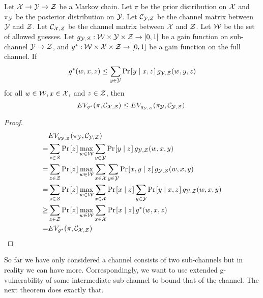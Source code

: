 \begin{theorem} \label{thm DPI 3}
	Let $\mathcal{X} \rightarrow \mathcal{Y} \rightarrow \mathcal{Z}$ be a Markov chain. Let $\pi$ be the prior distribution on $\mathcal{X}$ and $\pi_{\mathcal{Y}}$ be the posterior distribution on $\mathcal{Y}$. Let $\mathcal{C}_{\mathcal{Y}, \mathcal{Z}}$ be the channel matrix between $\mathcal{Y}$ and $\mathcal{Z}$. Let $\mathcal{C}_{\mathcal{X},\mathcal{Z}}$ be the channel matrix between $\mathcal{X}$ and $\mathcal{Z}$. Let $\mathcal{W}$ be the set of allowed guesses. Let $g_{\mathcal{Y},\mathcal{Z}}: \mathcal{W} \times \mathcal{Y} \times \mathcal{Z} \rightarrow [0,1]$ be a gain function on sub-channel $\mathcal{Y} \rightarrow \mathcal{Z}$, and $g^{*}: \mathcal{W} \times \mathcal{X} \times \mathcal{Z} \rightarrow [0,1]$ be a gain function on the full channel. If
	\begin{equation} \label{thm DPI 3 condition}
	g^{*}(w, x, z) \leq \sum_{y \in \Y} \prob{y \mid x, z} g_{\Y, \Z}(w, y, z)
	\end{equation}
	for all $w \in \mathcal{W}, x \in \mathcal{X},$ and $z \in \mathcal{Z}$, then
	\begin{equation*}
	EV_{g^{*}}(\pi, \mathcal{C}_{\mathcal{X},\mathcal{Z}}) \leq EV_{g_{\mathcal{Y},\mathcal{Z}}}(\pi_{\mathcal{Y}}, \mathcal{C}_{\mathcal{Y},\mathcal{Z}}).
	\end{equation*}
\end{theorem}


\begin{proof}
	\begin{align*}
	  &	EV_{g_{\Y,\Z}}(\pi_{\Y}, \channel_{\Y,\Z}) \\
	= & \sum_{z \in \Z} \prob{z} \max_{w \in \W} \sum_{y \in \Y} \prob{y \mid z} g_{\Y, \Z}(w, x, y) \\
	= & \sum_{z \in \Z} \prob{z} \max_{w \in \W} \sum_{x \in \X} \sum_{y \in \Y} \prob{x, y \mid z} g_{\Y, \Z}(w, x, y) \\
	= & \sum_{z \in \Z} \prob{z} \max_{w \in \W} \sum_{x \in \X} \prob{x \mid z} \sum_{y \in \Y} \prob{y \mid x, z} g_{\Y, \Z}(w, x, y) \\
	\geq & \sum_{z \in \Z} \prob{z} \max_{w \in \W} \sum_{x \in \X} \prob{x \mid z} g^{*}(w, x, z) \\
	= & EV_{g^{*}}(\pi, \channel_{\X,\Z})
	\end{align*}
\end{proof}


So far we have only considered a channel consists of two sub-channels but in reality we can have more. Correspondingly, we want to use extended g-vulnerability of some intermediate sub-channel to bound that of the channel. The next theorem does exactly that.


